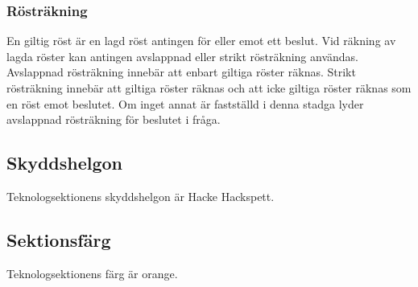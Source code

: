\subsubsection{Rösträkning}
En giltig röst är en lagd röst antingen för eller emot ett beslut.
Vid räkning av lagda röster kan antingen avslappnad eller strikt rösträkning användas.
Avslappnad rösträkning innebär att enbart giltiga röster räknas.
Strikt rösträkning innebär att giltiga röster räknas och att icke giltiga röster räknas som en röst emot beslutet.
Om inget annat är fastställd i denna stadga lyder avslappnad rösträkning för beslutet i fråga.
\subsection{Skyddshelgon}
Teknologsektionens skyddshelgon är Hacke Hackspett.
\subsection{Sektionsfärg}
Teknologsektionens färg är orange.
